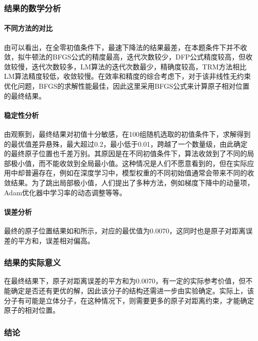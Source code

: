 \documentclass[12pt,a4paper]{article}
\begin{document}
\subsubsection{结果的数学分析}

\paragraph{不同方法的对比} 由可以看出，在全零初值条件下，最速下降法的结果最差，在本题条件下并不收敛，拟牛顿法的BFGS公式的精度最高，迭代次数较少，DFP公式精度较高，但收敛较慢，迭代次数较多，LM算法的迭代次数最少，精确度较高，TRM方法相比LM算法精度较低，收敛较慢。在效率和精度的综合考虑下，对于该非线性无约束优化问题，BFGS的求解性能最佳，因此这里采用BFGS公式来计算原子相对位置的最终结果。

\paragraph{稳定性分析} 由观察到，最终结果对初值十分敏感，在100组随机选取的初值条件下，求解得到的最优值差异悬殊，最大超过0.2，最小低于0.01，跨越了一个数量级，由此确定的最终原子位置也千差万别。其原因是在不同初值条件下，算法收敛到了不同的局部极小值，而不能收敛到全局最小值。这种情况是人们不愿意看到的，但在实际应用中却普遍存在，例如在深度学习中，模型权重的不同初始值通常会带来不同的收敛结果。为了跳出局部极小值，人们提出了多种方法，例如梯度下降中的动量项，Adam优化器中学习率的动态调整等等。

\paragraph{误差分析} 最终的原子位置结果如和所示，对应的最优值为0.0070，这同时也是原子对距离误差的平方和，误差相对偏高。

\subsubsection{结果的实际意义}

在最终结果下，原子对距离误差的平方和为0.0070，有一定的实际参考价值，但不能确定是否还有更优的解，因此该分子的结构还需进一步由实验确定。实际上，该分子有可能是立体分子，在这种情况下，则需要更多的原子对距离约束，才能确定原子的相对位置。

\subsubsection{结论}
\end{document}

